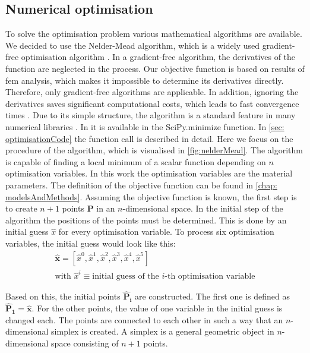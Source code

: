 \subsection{Numerical optimisation} \label{subsec: numericaloptimisation}
To solve the optimisation problem various mathematical algorithms are available. We decided to use the Nelder-Mead algorithm, which is a widely used gradient-free optimisation algorithm \cite{gao_implementing_2012}. In a gradient-free algorithm, the derivatives of the function are neglected in the process. Our objective function is based on results of \acrshort{fem} analysis, which makes it impossible to determine its derivatives directly. Therefore, only gradient-free algorithms are applicable. In addition, ignoring the derivatives saves significant computational costs, which leads to fast convergence times \cite{pham_comparative_2011}. Due to its simple structure, the algorithm is a standard feature in many numerical libraries \cite{singer_efficient_2004}. In  it is available in the SciPy.minimize function. In \autoref{sec: optimisationCode} the function call is described in detail. Here we focus on the procedure of the algorithm, which is visualised in \autoref{fig:nelderMead}. The algorithm is capable of finding a local minimum of a scalar function depending on $n$ optimisation variables. In this work the optimisation variables are the material parameters. The definition of the objective function can be found in \autoref{chap: modelsAndMethods}. Assuming the objective function is known, the first step is to create $n+1$ points $\mathbf{P}$ in an $n$-dimensional space. In the initial step of the algorithm the positions of the points must be determined. This is done by an initial guess $\hat{x}$ for every optimisation variable. To process six optimisation variables, the initial guess would look like this: 
\begin{gather}
    \mathbf{\hat{x}} = [\hat{x}^0, \hat{x}^1, \hat{x}^2, \hat{x}^3, \hat{x}^4, \hat{x}^5] \\
    \text{with } \hat{x}^i \equiv \text{initial guess of the $i$-th optimisation variable}
\end{gather}

Based on this, the initial points $\mathbf{\hat{P}_i}$ are constructed. The first one is defined as $\mathbf{\hat{P}_1} = \mathbf{\hat{x}}$. For the other points, the value of one variable in the initial guess is changed each. The points are connected to each other in such a way that an $n$-dimensional simplex is created. A simplex is a general geometric object in $n$-dimensional space consisting of $n+1$ points.

